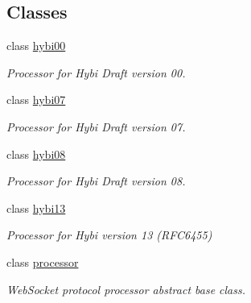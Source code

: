 \subsection*{Classes}
\begin{DoxyCompactItemize}
\item 
class \hyperlink{classwebsocketpp_1_1processor_1_1hybi00}{hybi00}
\begin{DoxyCompactList}\small\item\em Processor for Hybi Draft version 00. \end{DoxyCompactList}\item 
class \hyperlink{classwebsocketpp_1_1processor_1_1hybi07}{hybi07}
\begin{DoxyCompactList}\small\item\em Processor for Hybi Draft version 07. \end{DoxyCompactList}\item 
class \hyperlink{classwebsocketpp_1_1processor_1_1hybi08}{hybi08}
\begin{DoxyCompactList}\small\item\em Processor for Hybi Draft version 08. \end{DoxyCompactList}\item 
class \hyperlink{classwebsocketpp_1_1processor_1_1hybi13}{hybi13}
\begin{DoxyCompactList}\small\item\em Processor for Hybi version 13 (R\+F\+C6455) \end{DoxyCompactList}\item 
class \hyperlink{classwebsocketpp_1_1processor_1_1processor}{processor}
\begin{DoxyCompactList}\small\item\em Web\+Socket protocol processor abstract base class. \end{DoxyCompactList}\end{DoxyCompactItemize}
